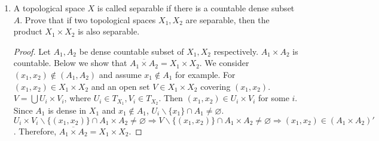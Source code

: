 \documentclass{article}
\def\emptyset{\varnothing}
\begin{document}
\begin{enumerate}
\begin{proof}
If $x\in A$, $f(x)=0$; if $f(x)=0$, there exists $\{y_n\}$ such that $d(x,y_n)\to 0$, and $x\in \bar{A}=A$
\end{proof}
\item A topological space $X$ is called separable if there is a countable dense subset $A$. Prove that if two topological spaces $X_1,X_2$ are separable, then the product $X_1\times X_2$ is also separable.
\begin{proof}
Let $A_1,A_2$ be dense countable subset of $X_1,X_2$ respectively. $A_1\times A_2$ is countable. Below we show that $\overline{A_1\times A_2}=X_1\times X_2$.
We consider $(x_1,x_2) \notin (A_1,A_2)$ and assume $x_1\notin A_1$ for example. For $(x_1,x_2)\in X_1\times X_2$ and an open set $V\in X_1\times X_2$ covering $(x_1,x_2)$. $V=\bigcup U_i\times V_i$, where $U_i\in T_{X_1},V_i \in T_{X_2}$. Then $(x_1,x_2)\in U_i\times V_i$ for some $i$. Since $A_1$ is dense in $X_1$ and $x_1\notin A_1$, $U_i\backslash\{x_1\}\cap A_1\neq \emptyset$. $U_i\times V_i\backslash\{(x_1,x_2)\}\cap A_1\times A_2 \neq \emptyset\Rightarrow V\backslash\{(x_1,x_2)\}\cap A_1\times A_2 \neq \emptyset\Rightarrow (x_1,x_2)\in (A_1\times A_2)'$. Therefore,  $\overline{A_1\times A_2}=X_1\times X_2$.
\end{proof}
\end{enumerate}
\end{document}
